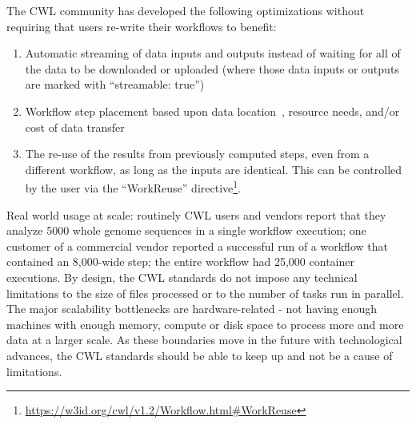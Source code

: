 \documentclass[sigconf,revew,screen,timestamp,nonacm]{acmart}
\newcommand{\todorone}[1]{\todo[color=orange!40]{R1.#1}}
\newcommand{\todortwo}[1]{\todo[linecolor=white,color=KamPurple!40]{R2.#1}}
\begin{document}
{\todortwo{4}The CWL community has developed the following optimizations without requiring that users re-write their workflows to benefit:
\begin{enumerate}
\item Automatic streaming of data inputs and outputs instead of waiting for all of the data to be downloaded or uploaded (where those data inputs or outputs are marked with ``streamable: true'')
\item Workflow step placement based upon data location~\cite{jiang_tr-19-01_2019}, resource needs, and/or cost of data transfer~\cite{jiang_pivot_2019}
\item \todorone{4}The re-use of the results from previously computed steps, even from a different workflow, as long as the inputs are identical. This can be controlled by the user via the ``WorkReuse'' directive\footnote{\url{https://w3id.org/cwl/v1.2/Workflow.html\#WorkReuse}}.
\end{enumerate}

Real world usage at scale: routinely CWL users and vendors report that they analyze 5000 whole genome sequences in a single workflow execution; one customer of a commercial vendor reported a successful run of a workflow that contained an 8,000-wide step; the entire workflow had 25,000 container executions. By design, the CWL standards do not impose any technical limitations to the size of files processed or to the number of tasks run in parallel. The major scalability bottlenecks are hardware-related - not having enough machines with enough memory, compute or disk space to process more and more data at a larger scale. As these boundaries move in the future with technological advances, the CWL standards should be able to keep up and not be a cause of limitations.
}
\end{document}
